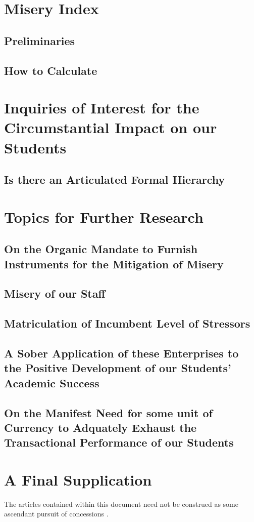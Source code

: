 \documentclass[UTF8]{article}
\begin{document}
	\section{Misery Index}
	\subsection{Preliminaries}
	\subsection{How to Calculate}
	
	\section{Inquiries of Interest for the Circumstantial Impact on our Students}
	\subsection{Is there an Articulated Formal Hierarchy }
	
	\section{Topics for Further Research}
	\subsection{On the Organic Mandate to Furnish Instruments for the Mitigation of Misery}
	\subsection{Misery of our Staff}
	\subsection{Matriculation of Incumbent Level of Stressors}
	\subsection{A Sober Application of these Enterprises to the Positive Development of our Students' Academic Success}
	\subsection{On the Manifest Need for some unit of Currency to Adquately Exhaust the Transactional Performance of our Students}
	
	\section{A Final Supplication}
	The articles contained within this document need not be construed as some ascendant pursuit of concessions
	.
	
\end{document}
